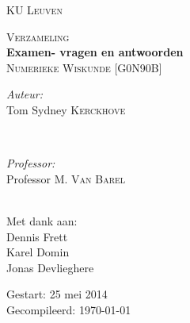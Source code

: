 \begin{titlepage}
\thispagestyle{empty}
\newcommand{\HRule}{\rule{\linewidth}{0.5mm}}
\center
\textsc{\LARGE KU Leuven}\\[1.5cm]
\vfill

\textsc{\large Verzameling}\\[0.5cm]
{ \Huge \bfseries Examen- vragen en antwoorden}\\[0.4cm]
\textsc{\large Numerieke Wiskunde [G0N90B]}\\[0.5cm]
\vfill

\begin{minipage}{0.4\textwidth}
\begin{flushleft} \large
\emph{Auteur:}\\
Tom Sydney \textsc{Kerckhove}
\end{flushleft}
\end{minipage}
~
\begin{minipage}{0.4\textwidth}
\begin{flushright} \large
\emph{Professor:} \\
Professor M. \textsc{Van Barel}\\
\end{flushright}
\end{minipage}\\[4cm]

Met dank aan:\\
{\large Dennis Frett\\ Karel Domin\\ Jonas Devlieghere\\}
\vfill

{\large Gestart: 25 mei 2014\\ Gecompileerd: \today}\\[3cm]
\vfill 

\end{titlepage}